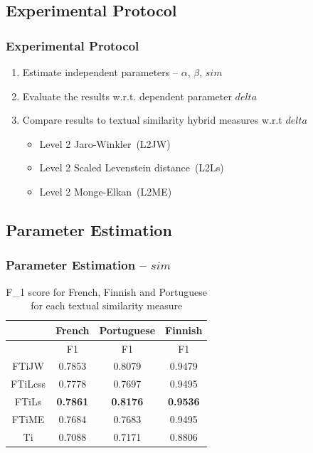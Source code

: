 \documentclass{beamer}
\begin{document}
\subsection{Experimental Protocol}
\begin{frame}
	\frametitle{Experimental Protocol}
	\begin{enumerate}
	\item Estimate independent parameters -- \(\alpha\), \(\beta\), \(sim\)
	\vfill
	\item Evaluate the results w.r.t. dependent parameter \(delta\)
	\vfill
	\item Compare results to textual similarity hybrid measures w.r.t \(delta\)
	\begin{itemize}
	\item Level 2 Jaro-Winkler~(L2JW)
	\item Level 2 Scaled Levenstein distance~(L2Ls)
	\item Level 2 Monge-Elkan~(L2ME)
	\end{itemize}
	\end{enumerate}
\end{frame}

\subsection{Parameter Estimation}

\begin{frame}
	\frametitle{Parameter Estimation -- \(sim\)}
	\begin{table}
	{\centering \footnotesize
	\begin{tabular}{|c|c|c|c|}
	\hline &French&Portuguese&Finnish\\
	\hline &F1&F1&F1\\
	\hline FTiJW&0.7853&0.8079&0.9479\\
	\hline FTiLcss&0.7778&0.7697&0.9495\\
	\hline FTiLs&\textbf{0.7861}&\textbf{0.8176}&\textbf{0.9536}\\
	\hline FTiME&0.7684&0.7683&0.9495\\
	\hline Ti&0.7088&0.7171&0.8806\\
	\hline 
	\end{tabular} 
	\caption{\scriptsize F\_1 score for French, Finnish and Portuguese for each textual similarity measure}
	\label{tab:expe1}
	}
	\end{table}
\end{frame}
\end{document}
